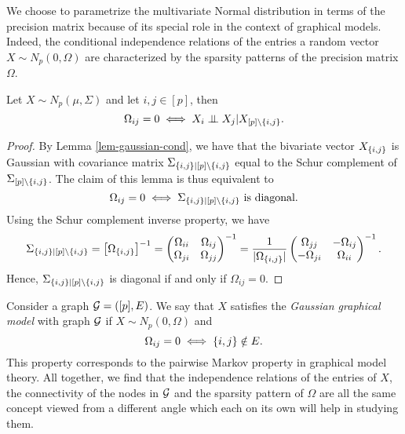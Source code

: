 We choose to parametrize the multivariate Normal distribution in terms of the precision matrix because of its special role in the context of graphical models. Indeed, the conditional independence relations of the entries a random vector $X \sim N_p(0, \Omega)$ are characterized by the sparsity patterns of the precision matrix $\Omega$.
\
\begin{lemma}
    Let $X \sim N_p(\mu, \Sigma)$ and let $i, j \in [p]$, then
    \begin{equation*}
        \Omega_{ij} = 0 \iff X_i \perp\mkern-9.5mu\perp X_j | X_{[p] \setminus {\left\{i,j\right\}}}.
    \end{equation*}
\end{lemma}
\begin{proof}
    By Lemma \ref{lem-gaussian-cond}, we have that the bivariate vector $X_{{\left\{i,j\right\}}}$ is Gaussian with covariance matrix $\Sigma_{{\left\{i,j\right\}}|[p]\setminus{\left\{i,j\right\}}}$ equal to the Schur complement of $\Sigma_{[p] \setminus {\left\{i,j\right\}}}$. The claim of this lemma is thus equivalent to 
    \begin{equation*}
        \Omega_{ij} = 0 \iff \Sigma_{{\left\{i,j\right\}}|[p]\setminus{\left\{i,j\right\}}}\ {\textrm{is diagonal}}.
    \end{equation*}
    Using the Schur complement inverse property, we have 
    \begin{equation*}
        \Sigma_{{\left\{i,j\right\}}|[p]\setminus{\left\{i,j\right\}}} 
        = \left[\Omega_{{\left\{i,j\right\}}}\right]^{-1} 
        = \begin{pmatrix}
            \Omega_{ii} & \Omega_{ij}\\
            \Omega_{ji} & \Omega_{jj}
            \end{pmatrix}^{-1}
        = \frac{1}{|\Omega_{{\left\{i,j\right\}}}|} \begin{pmatrix}
            \Omega_{jj} & -\Omega_{ij}\\
            -\Omega_{ji} & \Omega_{ii} 
            \end{pmatrix}^{-1}.
    \end{equation*}
    Hence, $\Sigma_{{\left\{i,j\right\}}|[p]\setminus{\left\{i,j\right\}}}$ is diagonal if and only if $\Omega_{ij} = 0$.
\end{proof}

Consider a graph ${\mathcal{G}} = ([p], E)$. We say that $X$ satisfies the \textit{Gaussian graphical model} with graph ${\mathcal{G}}$ if $X \sim N_p(0, \Omega)$ and
\begin{equation} \label{eq-ggm}
    \Omega_{i j} = 0 \iff {\left\{i,j\right\}} \notin E.
\end{equation}
This property corresponds to the pairwise Markov property in graphical model theory. All together, we find that the independence relations of the entries of $X$, the connectivity of the nodes in ${\mathcal{G}}$ and the sparsity pattern of $\Omega$ are all the same concept viewed from a different angle which each on its own will help in studying them.

